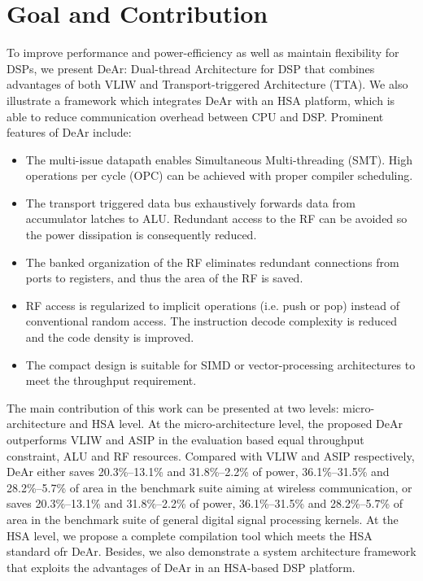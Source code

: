     \section{Goal and Contribution}
        To improve performance and power-efficiency as well as maintain flexibility for DSPs, 
        we present DeAr: Dual-thread Architecture for DSP that combines advantages of both VLIW and Transport-triggered Architecture (TTA).
        We also illustrate a framework which integrates DeAr with an HSA platform, which is able to reduce communication overhead between CPU and DSP. 
        Prominent features of DeAr include:
        \begin{itemize}
            \item The multi-issue datapath enables Simultaneous Multi-threading (SMT). High operations per cycle (OPC) can be achieved with proper compiler scheduling.
            \item The transport triggered data bus exhaustively forwards data from accumulator latches to ALU. Redundant access to the RF can be avoided so the power dissipation is consequently reduced.
            \item The banked organization of the RF eliminates redundant connections from ports to registers, and thus the area of the RF is saved.
            \item RF access is regularized to implicit operations (i.e. push or pop) instead of conventional random access. The instruction decode complexity is reduced and the code density is improved.
            \item The compact design is suitable for SIMD or vector-processing architectures to meet the throughput requirement.
        \end{itemize}
        \indent
        The main contribution of this work can be presented at two levels: micro-architecture and HSA level. 
        At the micro-architecture level, the proposed DeAr outperforms VLIW and ASIP in the evaluation based equal throughput constraint, ALU and RF resources.
        Compared with VLIW and ASIP respectively, DeAr either saves 20.3\%--13.1\% and 31.8\%--2.2\% of power, 36.1\%--31.5\% and 28.2\%--5.7\% of area in the benchmark suite aiming at wireless communication, 
        or saves 20.3\%--13.1\% and 31.8\%--2.2\% of power, 36.1\%--31.5\% and 28.2\%--5.7\% of area in the benchmark suite of general digital signal processing kernels.
        At the HSA level, we propose a complete compilation tool which meets the HSA standard ofr DeAr.
        Besides, we also demonstrate a system architecture framework that exploits the advantages of DeAr in an HSA-based DSP platform.
